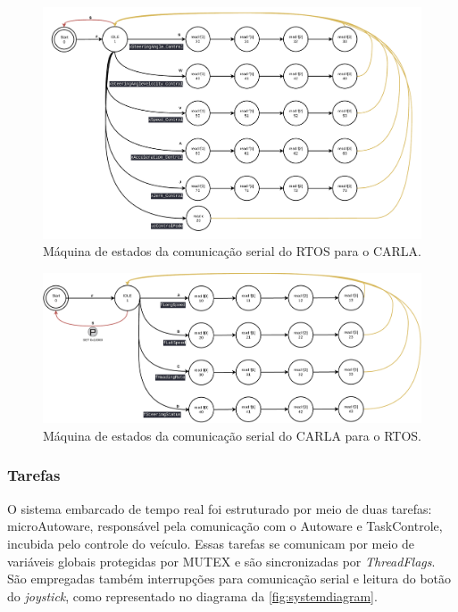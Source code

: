 \begin{figure}[H]
	\centering
	\includegraphics[width=0.8\linewidth]{img/sm_uc_2_carla}
	\caption{Máquina de estados da comunicação serial do RTOS para o CARLA.}
	\label{fig:smuccarla}
\end{figure}


\begin{figure}[H]
\centering
\includegraphics[width=0.8\linewidth]{img/sm_carla_2_uc}
\caption{Máquina de estados da comunicação serial do CARLA para o RTOS.}
\label{fig:sm_carla_uc}
\end{figure}



\subsubsection*{Tarefas}

O sistema embarcado de tempo real foi estruturado por meio de duas tarefas: microAutoware, responsável pela comunicação com o Autoware e TaskControle, incubida pelo controle do veículo. Essas tarefas se comunicam por meio de variáveis globais protegidas por MUTEX e são sincronizadas por \textit{ThreadFlags}. São empregadas também interrupções para comunicação serial e leitura do botão do \textit{joystick}, como representado no diagrama da \autoref{fig:systemdiagram}.

